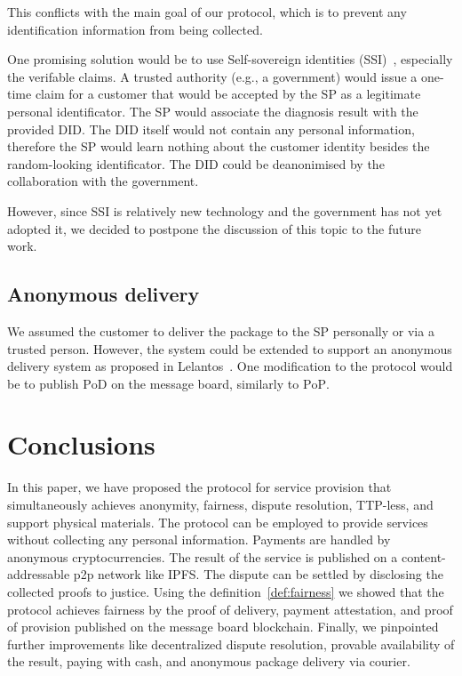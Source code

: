 \documentclass{ieeeaccess}
\begin{document}
This conflicts with the main goal of our protocol, which is to prevent any identification information from being collected.

One promising solution would be to use Self-sovereign identities (SSI)~\cite{muhleSurveyEssentialComponents2018}, especially the verifable claims. A trusted authority (e.g., a government) would issue a one-time claim for a customer that would be accepted by the SP as a legitimate personal identificator. The SP would associate the diagnosis result with the provided DID. The DID itself would not contain any personal information, therefore the SP would learn nothing about the customer identity besides the random-looking identificator. The DID could be deanonimised by the collaboration with the government.

However, since SSI is relatively new technology and the government has not yet adopted it, we decided to postpone the discussion of this topic to the future work.

\subsection{Anonymous delivery}\label{anonymous-delivery}

We assumed the customer to deliver the package to the SP personally or via a trusted person. However, the system could be extended to support an anonymous delivery system as proposed in Lelantos~\cite{altawyLelantosBlockchainBasedAnonymous2017}. One modification to the protocol would be to publish $\mathrm{PoD}$ on the message board, similarly to $\mathrm{PoP}$.

\section{Conclusions}\label{sec:conclusion}
In this paper, we have proposed the protocol for service provision that simultaneously achieves anonymity, fairness, dispute resolution, TTP-less, and support physical materials. The protocol can be employed to provide services without collecting any personal information. Payments are handled by anonymous cryptocurrencies. The result of the service is published on a content-addressable p2p network like IPFS. The dispute can be settled by disclosing the collected proofs to justice. 
Using the definition~\ref{def:fairness} we showed that the protocol achieves fairness by the proof of delivery, payment attestation, and proof of provision published on the message board blockchain. Finally, we pinpointed further improvements like decentralized dispute resolution, provable availability of the result, paying with cash, and anonymous package delivery via courier.
\end{document}
